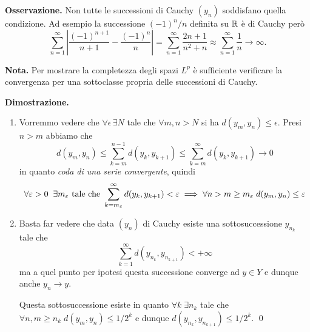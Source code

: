 \textbf{Osservazione.} Non tutte le successioni di Cauchy $(y_n)$ soddisfano quella condizione. Ad esempio la successione $(-1)^n / n$ definita su $\mathbb R$ è di Cauchy però
$$
\sum_{n=1}^\infty \left| \frac{(-1)^{n+1}}{n+1} - \frac{(-1)^n}{n} \right| 
= \sum_{n=1}^\infty \frac{2n + 1}{n^2 + n}
\approx \sum_{n=1}^\infty \frac{1}{n} \to \infty.
$$

\textbf{Nota.} Per mostrare la completezza degli spazi $L^p$ è sufficiente verificare la convergenza per una sottoclasse propria delle successioni di Cauchy.

\textbf{Dimostrazione.}
\begin{enumerate}
	\item Vorremmo vedere che $\forall \epsilon \, \exists N$ tale che $\forall m, n > N$ si ha $d(y_m, y_n) \leq \epsilon$. 
		Presi $n > m$ abbiamo che 
		$$
		d(y_m, y_n) \leq \sum_{k=m}^{n-1} d(y_k, y_{k+1}) \leq \sum_{k=m}^\infty d(y_k, y_{k+1}) \to 0
		$$
		in quanto \textit{coda di una serie convergente}, quindi 
		$$
		\forall \varepsilon > 0 \;\; \exists m_\varepsilon \text{ tale che } \sum_{k = m_\varepsilon}^\infty d(y_k, y_{k+1})< \varepsilon \implies \forall n > m \geq m_\varepsilon \; d(y_m, y_n) \leq \varepsilon
		$$ 

	\item
		Basta far vedere che data $(y_n)$ di Cauchy esiste una sottosuccessione $y_{n_k}$ tale che
		$$
		\sum_{k=1}^\infty d(y_{n_k}, y_{n_{k+1}}) < +\infty
		$$
		ma a quel punto per ipotesi questa successione converge ad $y \in Y$ e dunque anche $y_n \to y$. 

		Questa sottosuccessione esiste in quanto $\forall k \; \exists n_k$ tale che $\forall n, m \geq n_k \; d(y_m, y_n) \leq 1 /2 ^k$ e dunque $d(y_{n_k}, y_{n_{k+1}}) \leq 1 / 2^k$.
		\qed



\end{enumerate}



